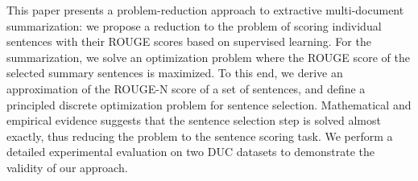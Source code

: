This paper presents a problem-reduction approach to extractive multi-document summarization: we propose a reduction to the problem of scoring individual sentences with their ROUGE scores based on supervised learning. For the summarization, we solve an optimization problem where the ROUGE score of the selected summary sentences is maximized. To this end, we derive an approximation of the ROUGE-N score of a set of sentences, and define a principled discrete optimization problem for sentence selection. Mathematical and empirical evidence suggests that the sentence selection step is solved almost exactly, thus reducing the problem to the sentence scoring task. We perform a detailed experimental evaluation on two DUC datasets to demonstrate the validity of our approach.
